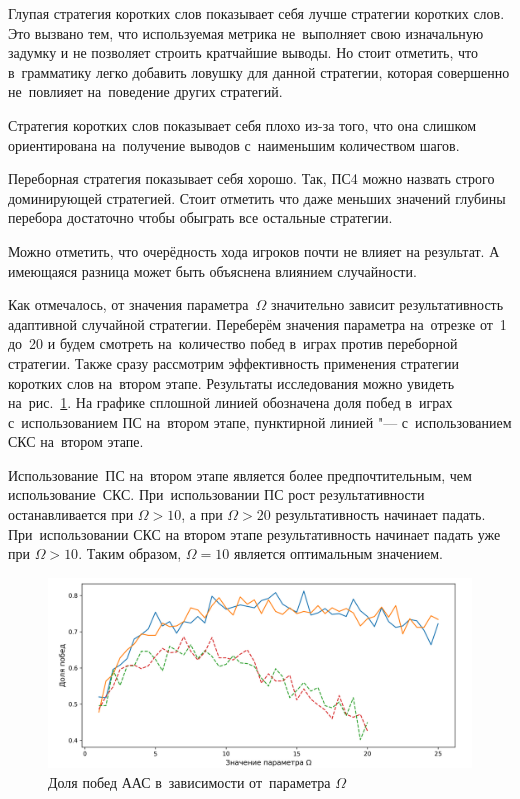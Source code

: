 \documentclass{csmathnotes}
\begin{document}
Глупая стратегия коротких слов показывает себя лучше стратегии коротких слов. Это вызвано тем, что используемая метрика не~выполняет свою изначальную задумку и не позволяет строить кратчайшие выводы. Но стоит отметить, что в~грамматику легко добавить ловушку для данной стратегии, которая совершенно не~повлияет на~поведение других стратегий. 

Стратегия коротких слов показывает себя плохо из-за того, что она слишком ориентирована на~получение выводов с~наименьшим количеством шагов. 

Переборная стратегия показывает себя хорошо. Так, ПС4 можно назвать строго доминирующей стратегией. Стоит отметить что даже меньших значений глубины перебора достаточно чтобы обыграть все остальные стратегии. 

Можно отметить, что очерёдность хода игроков почти не влияет на результат. А имеющаяся разница может быть объяснена влиянием случайности.

Как отмечалось, от значения параметра~$\Omega$ значительно зависит результативность адаптивной случайной стратегии. 
Переберём значения параметра на~отрезке от~1 до~20 и будем смотреть на~количество побед в~играх против переборной стратегии. Также сразу рассмотрим эффективность применения стратегии коротких слов на~втором этапе. Результаты исследования можно увидеть на~рис.~\ref{fig:aac_params}. На графике сплошной линией обозначена доля побед в~играх с~использованием ПС на~втором этапе, пунктирной линией "--- с~использованием СКС на~втором этапе. 

Использование~ПС на~втором этапе является более предпочтительным, чем использование~СКС. При~использовании ПС рост результативности останавливается при $\Omega > 10$, а при $\Omega > 20$ результативность начинает падать. При~использовании СКС на втором этапе результативность начинает падать уже при $\Omega > 10$. Таким образом, $\Omega = 10$ является оптимальным значением. 
\begin{figure}[!h]
	\centering
	\includegraphics[width=\textwidth]{omega.png}
	\caption{Доля побед ААС в~зависимости от~параметра $\Omega$}\label{fig:aac_params}
\end{figure}
\end{document}
